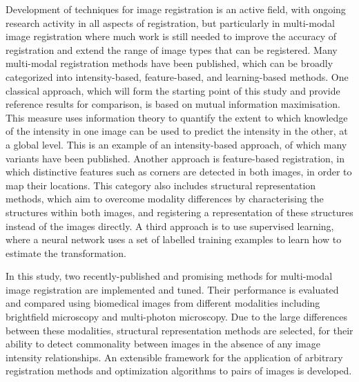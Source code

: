 \documentclass{report}
\begin{document}
Development of techniques for image registration is an active field, with ongoing research activity in all aspects of registration, but particularly in multi-modal image registration where much work is still needed to improve the accuracy of registration and extend the range of image types that can be registered. Many multi-modal registration methods have been published, which can be broadly categorized into intensity-based, feature-based, and learning-based methods. %
One classical approach, which will form the starting point of this study and provide reference results for comparison, is based on mutual information maximisation. This measure uses information theory to quantify the extent to which knowledge of the intensity in one image can be used to predict the intensity in the other, at a global level. This is an example of an intensity-based approach, of which many variants have been published. Another approach is feature-based registration, in which distinctive features such as corners are detected in both images, in order to map their locations. This category also includes structural representation methods, which aim to overcome modality differences by characterising the structures within both images, and registering a representation of these structures instead of the images directly. A third approach is to use supervised learning, where a neural network uses a set of labelled training examples to learn how to estimate the transformation. %

In this study, two recently-published and promising methods for multi-modal image registration are implemented and tuned. Their performance is evaluated and compared using biomedical images from different modalities including brightfield microscopy and multi-photon microscopy. Due to the large differences between these modalities, structural representation methods are selected, for their ability to detect commonality between images in the absence of any image intensity relationships. An extensible framework for the application of arbitrary registration methods and optimization algorithms to pairs of images is developed. 
\end{document}
